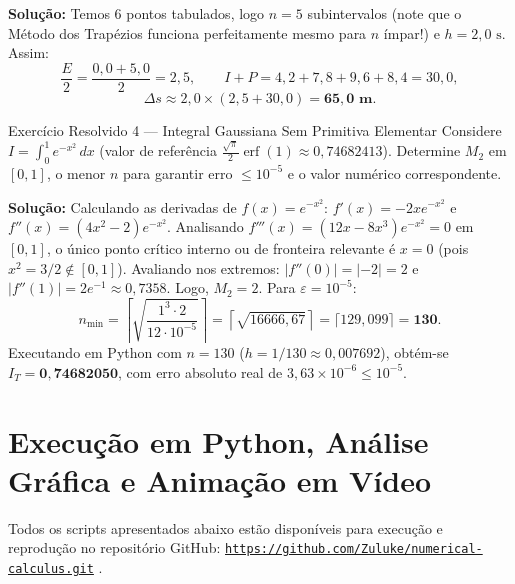 \documentclass[11pt,a4paper]{article}
\begin{document}
\textbf{Solução:}
Temos $6$ pontos tabulados, logo $n = 5$ subintervalos (note que o Método dos Trapézios funciona perfeitamente mesmo para $n$ ímpar!) e $h = 2{,}0\text{ s}$. Assim:
\[
\frac{E}{2} = \frac{0{,}0 + 5{,}0}{2} = 2{,}5, \qquad I + P = 4{,}2 + 7{,}8 + 9{,}6 + 8{,}4 = 30{,}0,
\]
\[
\Delta s \approx 2{,}0 \times (2{,}5 + 30{,}0) = \mathbf{65{,}0\text{ m}}.
\]

\begin{teobox}{Exercício Resolvido 4 --- Integral Gaussiana Sem Primitiva Elementar}
Considere $I = \int_0^1 e^{-x^2}\,dx$ (valor de referência $\frac{\sqrt{\pi}}{2}\operatorname{erf}(1) \approx 0{,}74682413$). Determine $M_2$ em $[0, 1]$, o menor $n$ para garantir erro $\le 10^{-5}$ e o valor numérico correspondente.
\end{teobox}

\textbf{Solução:}
Calculando as derivadas de $f(x) = e^{-x^2}$: $f'(x) = -2x e^{-x^2}$ e $f''(x) = (4x^2 - 2)e^{-x^2}$. Analisando $f'''(x) = (12x - 8x^3)e^{-x^2} = 0$ em $[0, 1]$, o único ponto crítico interno ou de fronteira relevante é $x = 0$ (pois $x^2 = 3/2 \notin [0, 1]$). Avaliando nos extremos: $|f''(0)| = |-2| = 2$ e $|f''(1)| = 2e^{-1} \approx 0{,}7358$. Logo, $M_2 = 2$. Para $\varepsilon = 10^{-5}$:
\[
n_{\min} = \left\lceil \sqrt{\frac{1^3 \cdot 2}{12 \cdot 10^{-5}}} \right\rceil = \left\lceil \sqrt{16666{,}67} \right\rceil = \lceil 129{,}099 \rceil = \mathbf{130}.
\]
Executando em Python com $n = 130$ ($h = 1/130 \approx 0{,}007692$), obtém-se $I_T = \mathbf{0{,}74682050}$, com erro absoluto real de $3{,}63 \times 10^{-6} \le 10^{-5}$.

\section{Execução em Python, Análise Gráfica e Animação em Vídeo}

Todos os scripts apresentados abaixo estão disponíveis para execução e reprodução no repositório GitHub: \href{https://github.com/Zuluke/numerical-calculus.git}{\nolinkurl{https://github.com/Zuluke/numerical-calculus.git}} \cite{cardoso2026_github}.
\end{document}
